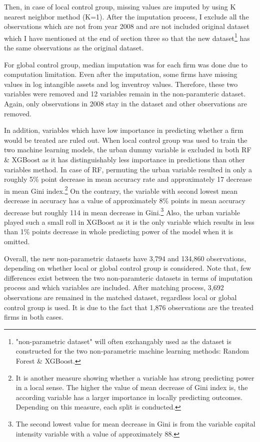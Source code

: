 \documentclass[11pt,a4paper,oneside]{article}
\begin{document}
\par
Then, in case of local control group, missing values are imputed by using K nearest neighbor method (K=1). After the imputation process, I exclude all the observations which are not from year 2008 and are not included original dataset which I have mentioned at the end of section three so that the new dataset\footnote{"non-parametric dataset" will often exchangably used as the dataset is constructed for the two non-parametric machine learning methods: Random Forest \& XGBoost.} has the same observations as the original dataset. 
\par
For global control group, median imputation was for each firm was done due to computation limitation. Even after the imputation, some firms have missing values in log intangible assets and log inventroy values. Therefore, these two variables were removed and 12 variables remain in the non-paramteric dataset. Again, only observations in 2008 stay in the dataset and other observations are removed. 
\par
In addition, variables which have low importance in predicting whether a firm would be treated are ruled out. When local control group was used to train the two machine learning models, the urban dummy variable is excluded in both RF \& XGBoost as it has distinguishably less importance in predictions than other variables method. In case of RF, permuting the urban variable resulted in only a roughly 5\% point decrease in mean accuracy rate and approximately 17 decrease in mean Gini index.\footnote{It is another measure showing whether a variable has strong predicting power in a local sense. The higher the value of mean decrease of Gini index is, the according variable has a larger importance in locally predicting outcomes. Depending on this measure, each split is conducted.} On the contrary, the variable with second lowest mean decrease in accuracy has a value of approximately 8\% points in mean accuracy decrease but roughly 114 in mean decrease in Gini.\footnote{The second lowest value for mean decrease in Gini is from the variable capital intensity variable with a value of approximately 88.} Also, the urban variable played such a small roll in XGBoost as it is the only variable which results in less than 1\% points decrease in whole predicting power of the model when it is omitted.
\par
Overall, the new non-parametric datasets have 3,794 and 134,860 observations, depending on whether local or global control group is considered. Note that, few differences exist between the two non-paramteric datasets in terms of imputation process and which variables are included.
After matching process, 3,692 observations are remained in the matched dataset, regardless local or global control group is used. It is due to the fact that 1,876 observations are the treated firms in both cases.
\end{document}
